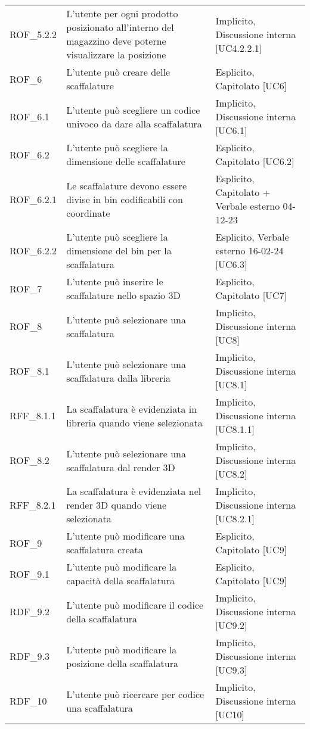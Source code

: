 \begin{xltabular}{\textwidth}{ p{0.1\textwidth} | X | p{0.3\textwidth} }
    ROF\_5.2.2 & L'utente per ogni prodotto posizionato all'interno del magazzino deve poterne visualizzare la posizione & Implicito, Discussione interna [UC4.2.2.1] \\
    ROF\_6 & L'utente può creare delle scaffalature & Esplicito, Capitolato [UC6]\\
    ROF\_6.1 & L'utente può scegliere un codice univoco da dare alla scaffalatura & Implicito, Discussione interna [UC6.1]\\
    ROF\_6.2 & L'utente può scegliere la dimensione delle scaffalature & Esplicito, Capitolato [UC6.2]\\
    ROF\_6.2.1 & Le scaffalature devono essere divise in bin codificabili con coordinate & Esplicito, Capitolato + Verbale esterno 04-12-23\\
    ROF\_6.2.2 & L'utente può scegliere la dimensione del bin per la scaffalatura & Esplicito, Verbale esterno 16-02-24 [UC6.3]\\
    ROF\_7 & L'utente può inserire le scaffalature nello spazio 3D & Esplicito, Capitolato [UC7]\\
    ROF\_8 & L'utente può selezionare una scaffalatura & Implicito, Discussione interna [UC8]\\
    ROF\_8.1 & L'utente può selezionare una scaffalatura dalla libreria & Implicito, Discussione interna [UC8.1]\\
    RFF\_8.1.1 & La scaffalatura è evidenziata in libreria quando viene selezionata & Implicito, Discussione interna [UC8.1.1]\\
    ROF\_8.2 & L'utente può selezionare una scaffalatura dal render 3D & Implicito, Discussione interna [UC8.2]\\
    RFF\_8.2.1 & La scaffalatura è evidenziata nel render 3D quando viene selezionata & Implicito, Discussione interna [UC8.2.1]\\
    ROF\_9 & L'utente può modificare una scaffalatura creata & Esplicito, Capitolato [UC9]\\
    ROF\_9.1 & L'utente può modificare la capacità della scaffalatura & Esplicito, Capitolato [UC9]\\
    RDF\_9.2 & L'utente può modificare il codice della scaffalatura & Implicito, Discussione interna [UC9.2]\\
    RDF\_9.3 & L'utente può modificare la posizione della scaffalatura & Implicito, Discussione interna [UC9.3]\\
    RDF\_10 & L'utente può ricercare per codice una scaffalatura & Implicito, Discussione interna [UC10]\\

\end{xltabular}
